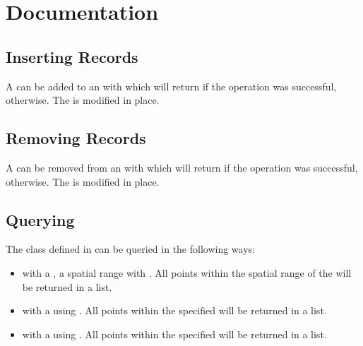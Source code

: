 \documentclass[letterpaper,10pt,english]{sphinxmanual}
\begin{document}
\section{Documentation}
\label{\detokenize{quadtree:documentation}}

\subsection{Inserting Records}
\label{\detokenize{quadtree:inserting-records}}
\sphinxAtStartPar
A  can be added to an  with  which will return  if the operation
was successful,  otherwise. The  is modified in place.


\subsection{Removing Records}
\label{\detokenize{quadtree:removing-records}}
\sphinxAtStartPar
A  can be removed from an  with  which will return  if the operation
was successful,  otherwise. The  is modified in place.


\subsection{Querying}
\label{\detokenize{quadtree:querying}}
\sphinxAtStartPar
The  class defined in  can be queried in the following ways:
\begin{itemize}
\item {} 
\sphinxAtStartPar
with a , a spatial range with . All points within the spatial range of the
 will be returned in a list.

\item {} 
\sphinxAtStartPar
with a  using . All points within the specified  will be returned in a list.

\item {} 
\sphinxAtStartPar
with a  using . All points within the specified  will be returned in a list.

\end{itemize}
\end{document}
